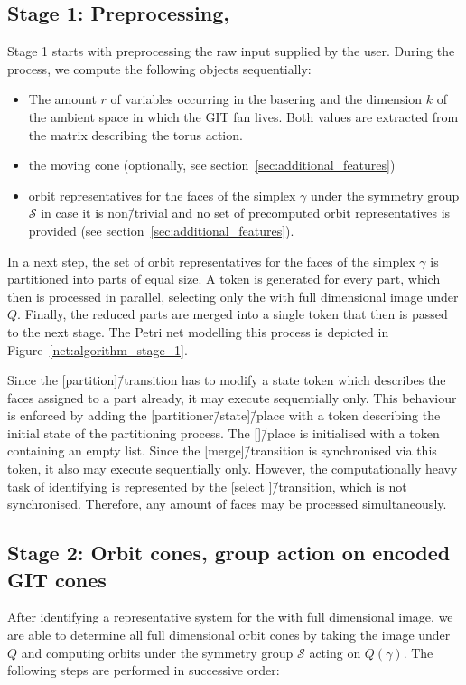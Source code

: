 

\subsection*{Stage 1: Preprocessing, \afaces}
Stage 1 starts with preprocessing the raw input supplied by the user. During the process, we compute the following objects sequentially:
\begin{itemize}
	\item The amount $r$ of variables occurring in the basering and the dimension $k$ of the ambient space in which the GIT fan lives. Both values are extracted from the matrix describing the torus action.
	\item the moving cone (optionally, see section~\ref{sec:additional_features})
	\item orbit representatives for the faces of the simplex $\gamma$ under the symmetry group $\mathcal{S}$ in case it is non\=/trivial and no set of precomputed orbit representatives is provided (see section~\ref{sec:additional_features}).
\end{itemize}

In a next step, the set of orbit representatives for the faces of the simplex $\gamma$ is partitioned into parts of equal size. A token is generated for every part, which then is processed in parallel, selecting only the \afaces{} with full dimensional image under $Q$. Finally, the reduced parts are merged into a single token that then is passed to the next stage. The Petri net modelling this process is depicted in Figure~\ref{net:algorithm_stage_1}.

Since the [partition]\=/transition has to modify a state token which describes the faces assigned to a part already, it may execute sequentially only. This behaviour is enforced by adding the [partitioner\=/state]\=/place with a token describing the initial state of the partitioning process.
The [\afaces]\=/place is initialised with a token containing an empty list. Since the [merge]\=/transition is synchronised via this token, it also may execute sequentially only. However, the computationally heavy task of identifying \afaces{} is represented by the [select \afaces{}]\=/transition, which is not synchronised. Therefore, any amount of faces may be processed simultaneously.



\subsection*{Stage 2: Orbit cones, group action on encoded GIT cones}
After identifying a representative system for the \afaces{} with full dimensional image, we are able to determine all full dimensional orbit cones by taking the image under $Q$ and computing orbits under the symmetry group $\mathcal{S}$ acting on $Q(\gamma)$. The following steps are performed in successive order:


